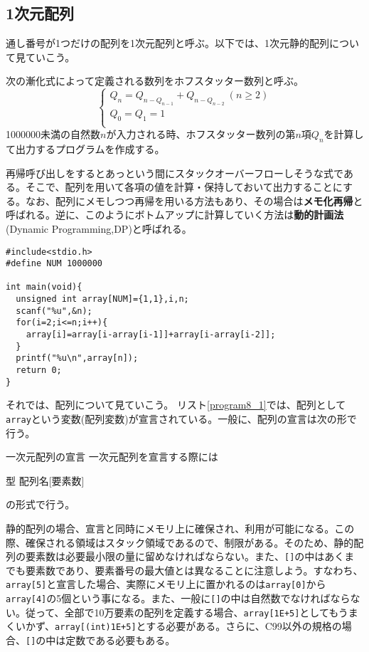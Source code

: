 \subsection{1次元配列}
通し番号が1つだけの配列を1次元配列と呼ぶ。以下では、1次元静的配列について見ていこう。
\begin{boxnote}
次の漸化式によって定義される数列をホフスタッター数列と呼ぶ。
\[
\left\{
\begin{array}{l}
 Q_n = Q_{n-Q_{n-1}}+Q_{n-Q_{n-2}} \ (n \ge 2) \\
 Q_0=Q_1=1 \\
\end{array}
\right.
\]
1000000未満の自然数$n$が入力される時、ホフスタッター数列の第$n$項$Q_n$を計算して出力するプログラムを作成する。
\end{boxnote}
\begin{boxnote}
再帰呼び出しをするとあっという間にスタックオーバーフローしそうな式である。そこで、配列を用いて各項の値を計算・保持しておいて出力することにする。なお、配列にメモしつつ再帰を用いる方法もあり、その場合は\textbf{メモ化再帰}と呼ばれる。逆に、このようにボトムアップに計算していく方法は\textbf{動的計画法}(Dynamic Programming,DP)と呼ばれる。
\begin{lstlisting}[caption=ホフスタッター数列の計算,label=program8_1]
#include<stdio.h>
#define NUM 1000000

int main(void){
  unsigned int array[NUM]={1,1},i,n;
  scanf("%u",&n);
  for(i=2;i<=n;i++){
    array[i]=array[i-array[i-1]]+array[i-array[i-2]];
  }
  printf("%u\n",array[n]);
  return 0;
}
\end{lstlisting}
\end{boxnote}

それでは、配列について見ていこう。
リスト\ref{program8_1}では、配列として\verb|array|という変数(配列変数)が宣言されている。一般に、配列の宣言は次の形で行う。
\begin{itembox}[l]{一次元配列の宣言}
一次元配列を宣言する際には
\begin{code}
型 配列名[要素数]
\end{code}
の形式で行う。
\end{itembox}

静的配列の場合、宣言と同時にメモリ上に確保され、利用が可能になる。この際、確保される領域はスタック領域であるので、制限がある。そのため、静的配列の要素数は必要最小限の量に留めなければならない。また、\verb|[]|の中はあくまでも要素数であり、要素番号の最大値とは異なることに注意しよう。すなわち、\verb|array[5]|と宣言した場合、実際にメモリ上に置かれるのは\verb|array[0]|から\verb|array[4]|の5個という事になる。また、一般に\verb|[]|の中は自然数でなければならない。従って、全部で10万要素の配列を定義する場合、\verb|array[1E+5]|としてもうまくいかず、\verb|array[(int)1E+5]|とする必要がある。さらに、C99以外の規格の場合、\verb|[]|の中は定数である必要もある。

